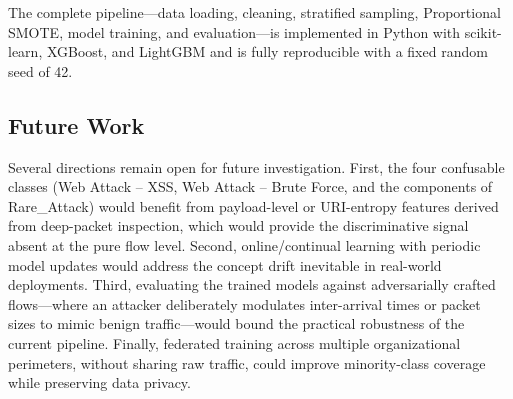 The complete pipeline---data loading, cleaning, stratified sampling, Proportional SMOTE, model training, and evaluation---is implemented in Python with scikit-learn, XGBoost, and LightGBM and is fully reproducible with a fixed random seed of 42.

\subsection*{Future Work}
Several directions remain open for future investigation. First, the four confusable classes (Web Attack -- XSS, Web Attack -- Brute Force, and the components of Rare\_Attack) would benefit from payload-level or URI-entropy features derived from deep-packet inspection, which would provide the discriminative signal absent at the pure flow level. Second, online/continual learning with periodic model updates would address the concept drift inevitable in real-world deployments. Third, evaluating the trained models against adversarially crafted flows---where an attacker deliberately modulates inter-arrival times or packet sizes to mimic benign traffic---would bound the practical robustness of the current pipeline. Finally, federated training across multiple organizational perimeters, without sharing raw traffic, could improve minority-class coverage while preserving data privacy.
